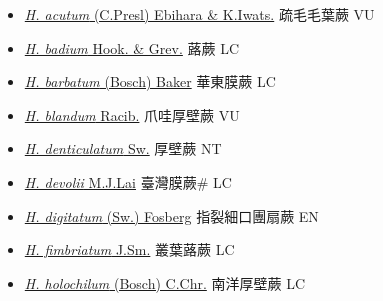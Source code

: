 \begin{itemize}
  \begin{itemize}
        \item[] \href{http://www.theplantlist.org/tpl1.1/search?q=Hymenophyllum+acutum}{\textit{H. acutum} (C.Presl) Ebihara \& K.Iwats.}   疏毛毛葉蕨 VU
        \item[] \href{http://www.theplantlist.org/tpl1.1/search?q=Hymenophyllum+badium}{\textit{H. badium} Hook. \& Grev.}     蕗蕨 LC
        \item[] \href{http://www.theplantlist.org/tpl1.1/search?q=Hymenophyllum+barbatum}{\textit{H. barbatum} (Bosch) Baker}   華東膜蕨 LC
        \item[] \href{http://www.theplantlist.org/tpl1.1/search?q=Hymenophyllum+blandum}{\textit{H. blandum} Racib.}   爪哇厚壁蕨 VU
        \item[] \href{http://www.theplantlist.org/tpl1.1/search?q=Hymenophyllum+denticulatum}{\textit{H. denticulatum} Sw.}   厚壁蕨 NT
        \item[] \href{http://www.theplantlist.org/tpl1.1/search?q=Hymenophyllum+devolii}{\textit{H. devolii} M.J.Lai}   臺灣膜蕨\# LC
        \item[] \href{http://www.theplantlist.org/tpl1.1/search?q=Hymenophyllum+digitatum}{\textit{H. digitatum} (Sw.) Fosberg}   指裂細口團扇蕨 EN
        \item[] \href{http://www.theplantlist.org/tpl1.1/search?q=Hymenophyllum+fimbriatum}{\textit{H. fimbriatum} J.Sm.}   叢葉蕗蕨 LC
        \item[] \href{http://www.theplantlist.org/tpl1.1/search?q=Hymenophyllum+holochilum}{\textit{H. holochilum} (Bosch) C.Chr.}     南洋厚壁蕨 LC

\end{itemize}
\end{itemize}
